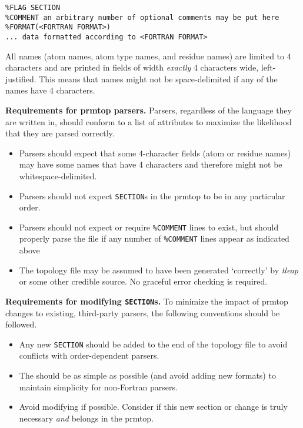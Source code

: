 \begin{verbatim}
%FLAG SECTION
%COMMENT an arbitrary number of optional comments may be put here
%FORMAT(<FORTRAN FORMAT>)
... data formatted according to <FORTRAN FORMAT>
\end{verbatim}

All names (\eg atom names, atom type names, and residue names) are limited to
4 characters and are printed in fields of width \emph{exactly} 4 characters
wide, left-justified. This means that names might not be space-delimited if any
of the names have 4 characters.

\textbf{Requirements for prmtop parsers.} Parsers, regardless of the language
they are written in, should conform to a list of attributes to maximize the
likelihood that they are parsed correctly.

\begin{itemize}
   \item Parsers should expect that some 4-character fields (\eg atom or residue
         names) may have some names that have 4 characters and therefore might
         not be whitespace-delimited.
   \item Parsers should not expect {\tt SECTION}s in the prmtop to be in any
         particular order.
   \item Parsers should not expect or require {\tt \%COMMENT} lines to exist,
         but should properly parse the file if any number of {\tt \%COMMENT}
         lines appear as indicated above
   \item The topology file may be assumed to have been generated `correctly' by
         \emph{tleap} or some other credible source. No graceful error checking
         is required.
\end{itemize}

\textbf{Requirements for modifying {\tt SECTION}s.} To minimize the impact of
prmtop changes to existing, third-party parsers, the following conventions
should be followed.

\begin{itemize}
   \item Any new {\tt SECTION} should be added to the end of the topology file to
         avoid conflicts with order-dependent parsers.
   \item The {\tt <FORTRAN FORMAT>} should be as simple as possible (and avoid
         adding new formats) to maintain simplicity for non-Fortran parsers.
   \item Avoid modifying if possible. Consider if this new section or change is
         truly necessary \emph{and} belongs in the prmtop.
\end{itemize}


